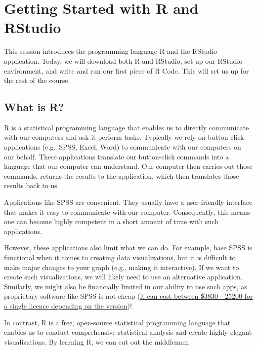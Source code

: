 \documentclass[
]{book}
\begin{document}
\chapter{\texorpdfstring{\textbf{Getting Started with R and RStudio}}{Getting Started with R and RStudio}}\label{rstudio}

This session introduces the programming language R and the RStudio application. Today, we will download both R and RStudio, set up our RStudio environment, and write and run our first piece of R Code. This will set us up for the rest of the course.

\section{What is R?}\label{what-is-r}

R is a statistical programming language that enables us to directly communicate with our computers and ask it perform tasks. Typically we rely on button-click applications (e.g.~SPSS, Excel, Word) to communicate with our computers on our behalf. These applications translate our button-click commands into a language that our computer can understand. Our computer then carries out those commands, returns the results to the application, which then translates those results back to us.

Applications like SPSS are convenient. They usually have a user-friendly interface that makes it easy to communicate with our computer. Consequently, this means one can become highly competent in a short amount of time with such applications.

However, these applications also limit what we can do. For example, base SPSS is functional when it comes to creating data visualizations, but it is difficult to make major changes to your graph (e.g., making it interactive). If we want to create such visualizations, we will likely need to use an alternative application. Similarly, we might also be financially limited in our ability to use such apps, as proprietary software like SPSS is not cheap (\href{https://www.ibm.com/products/spss-statistics/pricing}{it can cost between \$3830 - 25200 for a single licence depending on the version})!

In contrast, R is a free, open-source statistical programming language that enables us to conduct comprehensive statistical analysis and create highly elegant visualizations. By learning R, we can cut out the middleman.
\end{document}

